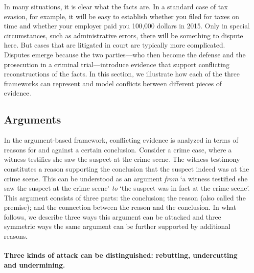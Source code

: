 \documentclass[10pt]{article}
\begin{document}
In many situations, it is clear what the facts are. In a standard case of tax evasion, for example, 
it will be easy to establish whether you filed for taxes on time and whether your employer paid you 100,000 dollars in 2015. Only in special circumstances, 
such as administrative errors, there will be something to dispute here. 
But cases that are litigated in court are typically more complicated.
Disputes emerge because the two parties---who then become the defense and the 
prosecution in a criminal trial---introduce evidence that support conflicting 
reconstructions of the facts. In this section, we illustrate how 
each of the three frameworks can represent and model conflicts 
between different pieces of evidence. 





\subsection{Arguments}
\label{sec:confArg}


In the argument-based framework, conflicting evidence is analyzed 
in terms of reasons for and against a certain conclusion. Consider a crime case, where a witness testifies she saw the 
suspect at the crime scene. The witness testimony constitutes a reason supporting the conclusion 
that the suspect indeed was at the crime scene. This can be understood as 
an argument \textit{from} `a witness testified she saw the suspect at the crime scene' \textit{to} 
`the suspect was in fact at the crime scene'.
This argument consists of three parts: the conclusion; the reason (also called the premise); and the connection between the reason and the conclusion.
In what follows, we describe three ways 
this argument can be attacked and three symmetric 
ways the same argument can be further supported by additional reasons. 


\paragraph{Three kinds of attack can be distinguished: rebutting, undercutting and undermining.}
\end{document}
